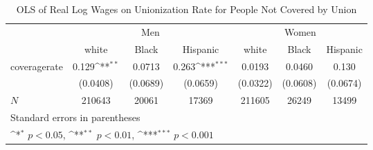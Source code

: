 \begin{table}[htbp]\centering
\def\sym#1{\ifmmode^{#1}\else\(^{#1}\)\fi}
\caption{OLS of Real Log Wages on Unionization Rate for People Not Covered by Union}
\begin{tabular}{l*{6}{c}}
\hline\hline
            &\multicolumn{3}{c}{Men}                                          &\multicolumn{3}{c}{Women}                                        \\\cmidrule(lr){2-4}\cmidrule(lr){5-7}
            &\multicolumn{1}{c}{white}&\multicolumn{1}{c}{Black}&\multicolumn{1}{c}{Hispanic}&\multicolumn{1}{c}{white}&\multicolumn{1}{c}{Black}&\multicolumn{1}{c}{Hispanic}\\
\hline
coveragerate&       0.129\sym{**} &      0.0713         &       0.263\sym{***}&      0.0193         &      0.0460         &       0.130         \\
            &    (0.0408)         &    (0.0689)         &    (0.0659)         &    (0.0322)         &    (0.0608)         &    (0.0674)         \\
\hline
\(N\)       &      210643         &       20061         &       17369         &      211605         &       26249         &       13499         \\
\hline\hline
\multicolumn{7}{l}{\footnotesize Standard errors in parentheses}\\
\multicolumn{7}{l}{\footnotesize \sym{*} \(p<0.05\), \sym{**} \(p<0.01\), \sym{***} \(p<0.001\)}\\
\end{tabular}
\end{table}
